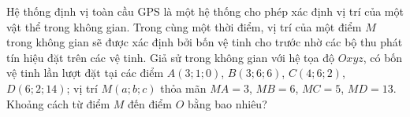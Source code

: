 \begin{ex}
Hệ thống định vị toàn cầu GPS là một hệ thống cho phép xác định vị trí của một vật thể trong không gian. Trong cùng một thời điểm, vị trí của một điểm $M$ trong không gian sẽ được xác định bởi bốn vệ tinh cho trước nhờ các bộ thu phát tín hiệu đặt trên các vệ tinh. Giả sử trong không gian với hệ tọa độ $Oxyz$, có bốn vệ tinh lần lượt đặt tại các điểm $A(3;1;0)$, $B(3;6;6)$, $C(4;6;2)$, $D(6;2;14)$; vị trí $M(a;b;c)$ thỏa mãn $MA=3$, $MB=6$, $MC=5$, $MD=13$. Khoảng cách từ điểm $M$ đến điểm $O$ bằng bao nhiêu?
\end{ex}
